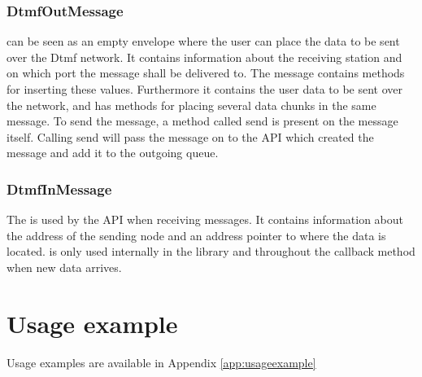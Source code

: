 \subsubsection{DtmfOutMessage}
 can be seen as an empty envelope where the user can place the data to be sent over the Dtmf network. It contains information about the receiving station and on which port the message shall be delivered to. The message contains methods for inserting these values. Furthermore it contains the user data to be sent over the network, and has methods for placing several data chunks in the same message. To send the message, a method called send is present on the message itself. Calling send will pass the message on to the API which created the message and add it to the outgoing queue.

\subsubsection{DtmfInMessage}
The  is used by the API when receiving messages. It contains information about the address of the sending node and an address pointer to where the data is located.  is only used internally in the library and throughout the callback method when new data arrives.

\section{Usage example}
Usage examples are available in Appendix \ref{app:usageexample}






